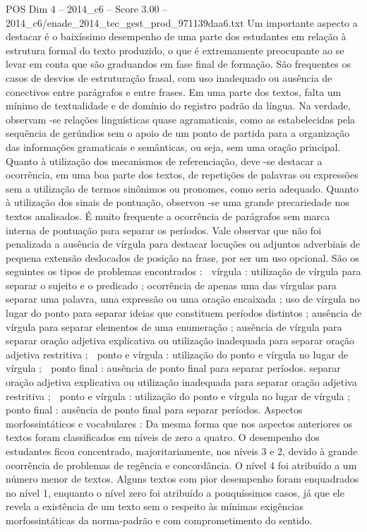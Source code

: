 \begin{textsample}{POS Dim 4 – 2014\_c6 – Score 3.00 – 2014\_c6/enade\_2014\_tec\_gest\_prod\_971139daa6.txt}
Um importante aspecto a destacar é o baixíssimo desempenho de uma parte dos estudantes em relação à estrutura formal do texto produzido, o que é extremamente preocupante ao se levar em conta que são graduandos em fase final de formação.
São frequentes os casos de desvios de estruturação frasal, com uso inadequado ou ausência de conectivos entre parágrafos e entre frases.
Em uma parte dos textos, falta um mínimo de textualidade e de domínio do registro padrão da língua.
Na verdade, observam -se relações linguísticas quase agramaticais, como as estabelecidas pela sequência de gerúndios sem o apoio de um ponto de partida para a organização das informações gramaticais e semânticas, ou seja, sem uma oração principal.
Quanto à utilização dos mecanismos de referenciação, deve -se destacar a ocorrência, em uma boa parte dos textos, de repetições de palavras ou expressões sem a utilização de termos sinônimos ou pronomes, como seria adequado.
Quanto à utilização dos sinais de pontuação, observou -se uma grande precariedade nos textos analisados.
É muito frequente a ocorrência de parágrafos sem marca interna de pontuação para separar os períodos.
Vale observar que não foi penalizada a ausência de vírgula para destacar locuções ou adjuntos adverbiais de pequena extensão deslocados de posição na frase, por ser um uso opcional.
São os seguintes os tipos de problemas encontrados :  vírgula : utilização de vírgula para separar o sujeito e o predicado ; ocorrência de apenas uma das vírgulas para separar uma palavra, uma expressão ou uma oração encaixada ; uso de vírgula no lugar do ponto para separar ideias que constituem períodos distintos ; ausência de vírgula para separar elementos de uma enumeração ; ausência de vírgula para separar oração adjetiva explicativa ou utilização inadequada para separar oração adjetiva restritiva ;  ponto e vírgula : utilização do ponto e vírgula no lugar de vírgula ;  ponto final : ausência de ponto final para separar períodos. separar oração adjetiva explicativa ou utilização inadequada para separar oração adjetiva restritiva ;  ponto e vírgula : utilização do ponto e vírgula no lugar de vírgula ;  ponto final : ausência de ponto final para separar períodos.
Aspectos morfossintáticos e vocabulares : Da mesma forma que nos aspectos anteriores os textos foram classificados em níveis de zero a quatro.
O desempenho dos estudantes ficou concentrado, majoritariamente, nos níveis 3 e 2, devido à grande ocorrência de problemas de regência e concordância.
O nível 4 foi atribuído a um número menor de textos.
Alguns textos com pior desempenho foram enquadrados no nível 1, enquanto o nível zero foi atribuído a pouquíssimos casos, já que ele revela a existência de um texto sem o respeito às mínimas exigências morfossintáticas da norma-padrão e com comprometimento do sentido.

\end{textsample}
